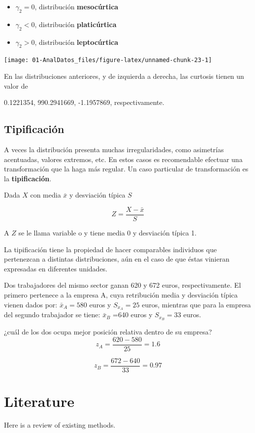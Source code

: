 \documentclass[]{book}
\theoremstyle{definition}
\theoremstyle{definition}
\theoremstyle{definition}
\theoremstyle{remark}
\begin{document}
\begin{itemize}
\item
  \(\gamma_2= 0\), distribución \textbf{mesocúrtica}
\item
  \(\gamma_2< 0\), distribución \textbf{platicúrtica}
\item
  \(\gamma_2> 0\), distribución \textbf{leptocúrtica}
\end{itemize}

\begin{center}\texttt{[image: 01-AnalDatos\_files/figure-latex/unnamed-chunk-23-1]} \end{center}

En las distribuciones anteriores, y de izquierda a derecha, las curtosis
tienen un valor de

0.1221354, 990.2941669, -1.1957869, respectivamente.

\section{Tipificación}\label{tipificacion}

A veces la distribución presenta muchas irregularidades, como asimetrías
acentuadas, valores extremos, etc. En estos casos es recomendable
efectuar una transformación que la haga más regular. Un caso particular
de transformación es la \textbf{tipificación}.

Dada \(X\) con media \(\bar{x}\) y desviación típica \(S\)

\[Z  =  \frac{X  -  \bar{x}}{S}\]

A \(Z\) se le llama variable o y tiene media 0 y desviación típica 1.

La tipificación tiene la propiedad de hacer comparables individuos que
pertenezcan a distintas distribuciones, aún en el caso de que éstas
vinieran expresadas en diferentes unidades.

Dos trabajadores del mismo sector ganan 620 y 672 euros,
respectivamente. El primero pertenece a la empresa A, cuya retribución
media y desviación típica vienen dados por: \(\bar{x}_A= 580\) euros y
\(S_{x_A} = 25\) euros, mientras que para la empresa del segundo
trabajador se tiene: \(\bar{x}_B\) =640 euros y \(S_{x_B} = 33\) euros.

¿cuál de los dos ocupa mejor posición relativa dentro de su empresa?
\[z_A=\frac{620-580}{25}=1.6\]

\[z_B=\frac{672-640}{33}=0.97\]

\chapter{Literature}\label{literature}

Here is a review of existing methods. \citep{xie2015}


\end{document}
